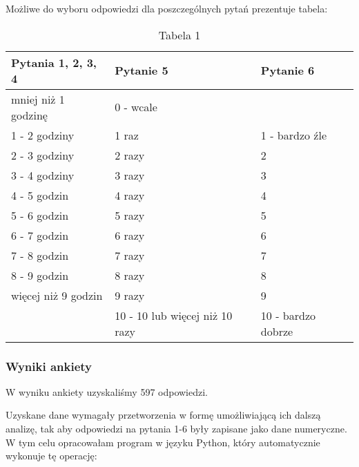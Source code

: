 \documentclass[12pt,a4paper]{article}
\begin{document}
Możliwe do wyboru odpowiedzi dla poszczególnych pytań prezentuje tabela:
\begin{table}[h]
    \centering
    \begin{tabular}{|l|l|l|}
        \hline \textbf{Pytania 1, 2, 3, 4} & \textbf{Pytanie 5} & \textbf{Pytanie 6} \\ \hline 
        mniej niż 1 godzinę & 0 - wcale &\\ \hline
        1 - 2 godziny & 1 raz & 1 - bardzo źle \\ \hline
        2 - 3 godziny & 2 razy & 2 \\ \hline
        3 - 4 godziny & 3 razy & 3 \\ \hline
        4 - 5 godzin & 4 razy & 4 \\ \hline
        5 - 6 godzin & 5 razy & 5 \\ \hline
        6 - 7 godzin & 6 razy & 6 \\ \hline
        7 - 8 godzin & 7 razy & 7 \\ \hline
        8 - 9 godzin & 8 razy & 8 \\ \hline
        więcej niż 9 godzin & 9 razy & 9 \\ \hline
         & 10 - 10 lub więcej niż 10 razy & 10 - bardzo dobrze \\ \hline
    \end{tabular}
    \caption*{Tabela 1}
\end{table}

\newpage
\subsubsection{Wyniki ankiety}
W wyniku ankiety uzyskaliśmy 597 odpowiedzi.

\vspace{2mm}
Uzyskane dane wymagały przetworzenia w formę umożliwiającą ich dalszą analizę, tak aby odpowiedzi na pytania 1-6 były zapisane jako dane numeryczne. W tym celu opracowałam program w języku Python, który automatycznie wykonuje tę operację:
\end{document}
